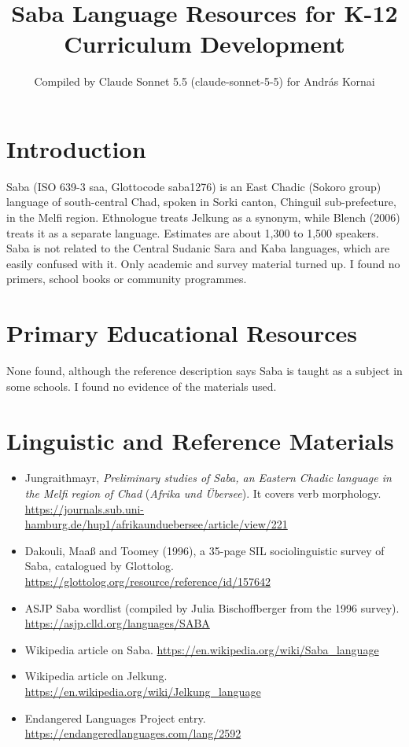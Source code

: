 \documentclass[12pt]{article}
\title{Saba Language Resources for K-12 Curriculum Development}
\author{Compiled by Claude Sonnet 5.5 (claude-sonnet-5-5) for Andr\'as Kornai}
\date{}
\begin{document}
\maketitle

\section{Introduction}
Saba (ISO 639-3 saa, Glottocode saba1276) is an East Chadic (Sokoro group) language of south-central Chad, spoken in Sorki canton, Chinguil sub-prefecture, in the Melfi region. Ethnologue treats Jelkung as a synonym, while Blench (2006) treats it as a separate language. Estimates are about 1,300 to 1,500 speakers. Saba is not related to the Central Sudanic Sara and Kaba languages, which are easily confused with it. Only academic and survey material turned up. I found no primers, school books or community programmes.

\section{Primary Educational Resources}
None found, although the reference description says Saba is taught as a subject in some schools. I found no evidence of the materials used.

\section{Linguistic and Reference Materials}
\begin{itemize}
\item Jungraithmayr, \emph{Preliminary studies of Saba, an Eastern Chadic language in the Melfi region of Chad} (\emph{Afrika und \"Ubersee}). It covers verb morphology. \url{https://journals.sub.uni-hamburg.de/hup1/afrikaunduebersee/article/view/221}
\item Dakouli, Maa\ss{} and Toomey (1996), a 35-page SIL sociolinguistic survey of Saba, catalogued by Glottolog. \url{https://glottolog.org/resource/reference/id/157642}
\item ASJP Saba wordlist (compiled by Julia Bischoffberger from the 1996 survey). \url{https://asjp.clld.org/languages/SABA}
\item Wikipedia article on Saba. \url{https://en.wikipedia.org/wiki/Saba_language}
\item Wikipedia article on Jelkung. \url{https://en.wikipedia.org/wiki/Jelkung_language}
\item Endangered Languages Project entry. \url{https://endangeredlanguages.com/lang/2592}
\end{itemize}
\end{document}
